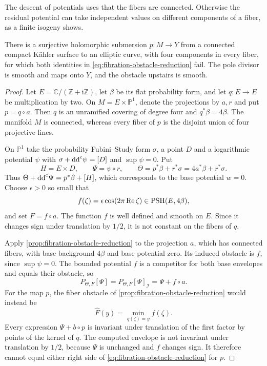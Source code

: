 The descent of potentials uses that the fibers are connected. Otherwise the residual potential can take independent values on different components of a fiber, as a finite isogeny shows.

\begin{example}\label{ex:disconnected-fiber-obstacle-descent}
There is a surjective holomorphic submersion $p\colon M\to Y$ from a connected compact K\"ahler surface to an elliptic curve, with four components in every fiber, for which both identities in \eqref{eq:fibration-obstacle-reduction} fail. The pole divisor is smooth and maps onto $Y$, and the obstacle upstairs is smooth.
\end{example}
\begin{proof}
Let $E=\mathbb C/(\mathbb Z+\mathrm i\mathbb Z)$, let $\beta$ be its flat probability form, and let $q\colon E\to E$ be multiplication by two. On $M=E\times\mathbb P^1$, denote the projections by $a,r$ and put $p=q\circ a$. Then $q$ is an unramified covering of degree four and $q^*\beta=4\beta$. The manifold $M$ is connected, whereas every fiber of $p$ is the disjoint union of four projective lines.

On $\mathbb P^1$ take the probability Fubini--Study form $\sigma$, a point $D$ and a logarithmic potential $\psi$ with $\sigma+\mathrm{dd}^{\mathrm{c}}\psi=[D]$ and $\sup\psi=0$. Put
\[
 H=E\times D,\qquad \Psi=\psi\circ r,\qquad
 \Theta=p^*\beta+r^*\sigma=4a^*\beta+r^*\sigma.
\]
Thus $\Theta+\mathrm{dd}^{\mathrm{c}}\Psi=p^*\beta+[H]$, which corresponds to the base potential $w=0$. Choose $\epsilon>0$ so small that
\[
 f(\zeta)=\epsilon\cos(2\pi\operatorname{Re}\zeta)
       \in\mathrm{PSH}(E,4\beta),
\]
and set $F=f\circ a$. The function $f$ is well defined and smooth on $E$. Since it changes sign under translation by $1/2$, it is not constant on the fibers of $q$.

Apply \cref{prop:fibration-obstacle-reduction} to the projection $a$, which has connected fibers, with base background $4\beta$ and base potential zero. Its induced obstacle is $f$, since $\sup\psi=0$. The bounded potential $f$ is a competitor for both base envelopes and equals their obstacle, so
\[
 P_{\Theta,F}[\Psi]=P_{\Theta,F}[\Psi]_{\mathcal I}
       =\Psi+f\circ a.
\]
For the map $p$, the fiber obstacle of \cref{prop:fibration-obstacle-reduction} would instead be
\[
 \widehat F(y)=\min_{q(\zeta)=y}f(\zeta).
\]
Every expression $\Psi+b\circ p$ is invariant under translation of the first factor by points of the kernel of $q$. The computed envelope is not invariant under translation by $1/2$, because $\Psi$ is unchanged and $f$ changes sign. It therefore cannot equal either right side of \eqref{eq:fibration-obstacle-reduction} for $p$.
\end{proof}


